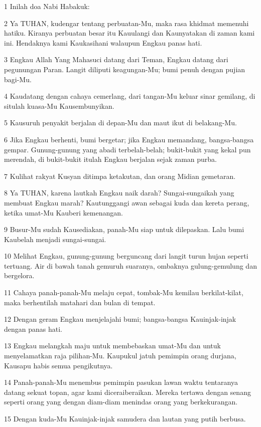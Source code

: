 \par 1 Inilah doa Nabi Habakuk:
\par 2 Ya TUHAN, kudengar tentang perbuatan-Mu, maka rasa khidmat memenuhi hatiku. Kiranya perbuatan besar itu Kauulangi dan Kaunyatakan di zaman kami ini. Hendaknya kami Kaukasihani walaupun Engkau panas hati.
\par 3 Engkau Allah Yang Mahasuci datang dari Teman, Engkau datang dari pegunungan Paran. Langit diliputi keagungan-Mu; bumi penuh dengan pujian bagi-Mu.
\par 4 Kaudatang dengan cahaya cemerlang, dari tangan-Mu keluar sinar gemilang, di situlah kuasa-Mu Kausembunyikan.
\par 5 Kausuruh penyakit berjalan di depan-Mu dan maut ikut di belakang-Mu.
\par 6 Jika Engkau berhenti, bumi bergetar; jika Engkau memandang, bangsa-bangsa gempar. Gunung-gunung yang abadi terbelah-belah; bukit-bukit yang kekal pun merendah, di bukit-bukit itulah Engkau berjalan sejak zaman purba.
\par 7 Kulihat rakyat Kusyan ditimpa ketakutan, dan orang Midian gemetaran.
\par 8 Ya TUHAN, karena lautkah Engkau naik darah? Sungai-sungaikah yang membuat Engkau marah? Kautunggangi awan sebagai kuda dan kereta perang, ketika umat-Mu Kauberi kemenangan.
\par 9 Busur-Mu sudah Kausediakan, panah-Mu siap untuk dilepaskan. Lalu bumi Kaubelah menjadi sungai-sungai.
\par 10 Melihat Engkau, gunung-gunung berguncang dari langit turun hujan seperti tertuang. Air di bawah tanah gemuruh suaranya, ombaknya gulung-gemulung dan bergelora.
\par 11 Cahaya panah-panah-Mu melaju cepat, tombak-Mu kemilau berkilat-kilat, maka berhentilah matahari dan bulan di tempat.
\par 12 Dengan geram Engkau menjelajahi bumi; bangsa-bangsa Kauinjak-injak dengan panas hati.
\par 13 Engkau melangkah maju untuk membebaskan umat-Mu dan untuk menyelamatkan raja pilihan-Mu. Kaupukul jatuh pemimpin orang durjana, Kausapu habis semua pengikutnya.
\par 14 Panah-panah-Mu menembus pemimpin pasukan lawan waktu tentaranya datang sekuat topan, agar kami diceraiberaikan. Mereka tertawa dengan senang seperti orang yang dengan diam-diam menindas orang yang berkekurangan.
\par 15 Dengan kuda-Mu Kauinjak-injak samudera dan lautan yang putih berbusa.

